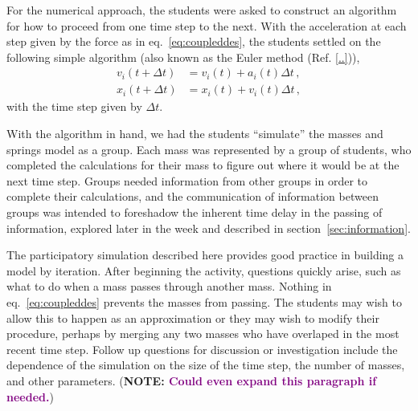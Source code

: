 \documentclass[prb,preprint]{revtex4-1}
\newcommand{\NOTE}[1]{\marginpar{\footnotesize\textbf{NOTE}} (\textbf{NOTE: #1})}
\newcommand{\calvin}[2]{\textcolor{purple}{\sout{#1}#2}}
\newcommand{\eq}[1]{eq.~\eqref{eq:#1}}
\renewcommand{\sec}[1]{section~\ref{sec:#1}}
\newcommand{\nn}{\nonumber}
\begin{document}
For the numerical approach, the students were asked to construct an algorithm
for how to proceed from one time step to the next. With the acceleration at each
step given by the force as in \eq{coupleddes}, the students settled on the
following simple algorithm (also known as the Euler method (Ref. \ref{..})),
\begin{align} \label{eq:algorithm}
v_i(t+\Delta t) &= v_i(t) + a_i(t)\Delta t
\,,\nn\\
x_i(t+\Delta t) &= x_i(t) + v_i(t)\Delta t
\,,\end{align}
with the time step given by $\Delta t$.

With the algorithm in hand, we had the students ``simulate'' the masses and
springs model as a group. Each mass was represented by a group of 
students, who completed the calculations for their mass to figure out where it would be
at the next time step.
Groups needed information from other groups in order to complete their calculations,
and the communication of information between groups was intended 
to foreshadow the inherent time delay in the passing of information, explored later in
the week and described in \sec{information}.


The participatory simulation described here provides good practice in building
a model by iteration. After beginning the activity, questions quickly arise, such
as what to do when a mass passes through another mass. Nothing in \eq{coupleddes} prevents
the masses from passing. The students may wish to allow this to happen as an approximation
or they may wish to modify their procedure, perhaps by merging any two masses who have overlaped
in the most recent time step. Follow up questions for discussion or investigation include
the dependence of the simulation on the size of the time step, the number of masses,
and other parameters.\NOTE{\calvin{}{Could even expand this paragraph if needed.}}
\end{document}
